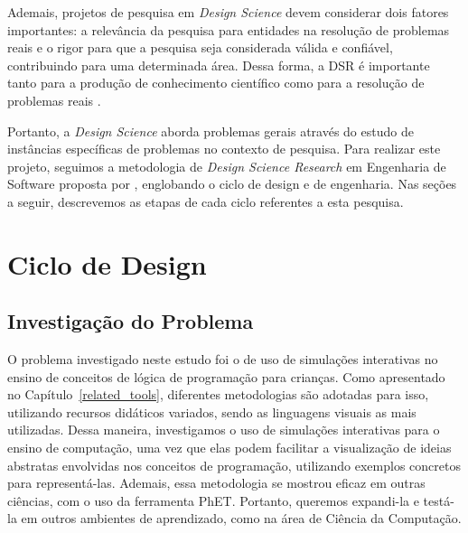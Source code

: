 Ademais, projetos de pesquisa em \textit{Design Science} devem considerar dois fatores importantes: a relevância da pesquisa para entidades na resolução de problemas reais e o rigor para que a pesquisa seja considerada válida e confiável, contribuindo para uma determinada área. Dessa forma, a DSR é importante tanto para a produção de conhecimento científico como para a resolução de problemas reais \citep{dresch2015design, runeson2020design}.

Portanto, a \textit{Design Science} aborda problemas gerais através do estudo de instâncias específicas de problemas no contexto de pesquisa. Para realizar este projeto, seguimos a metodologia de \textit{Design Science Research} em Engenharia de Software proposta por \citet{wieringa2014design}, englobando o ciclo de design e de engenharia. Nas seções a seguir, descrevemos as etapas de cada ciclo referentes a esta pesquisa.

\section{Ciclo de Design}

\subsection{Investigação do Problema}

O problema investigado neste estudo foi o de uso de simulações interativas no ensino de conceitos de lógica de programação para crianças. Como apresentado no Capítulo~\ref{related_tools}, diferentes metodologias são adotadas para isso, utilizando recursos didáticos variados, sendo as linguagens visuais as mais utilizadas. Dessa maneira, investigamos o uso de simulações interativas para o ensino de computação, uma vez que elas podem facilitar a visualização de ideias abstratas envolvidas nos conceitos de programação, utilizando exemplos concretos para representá-las. Ademais, essa metodologia se mostrou eficaz em outras ciências, com o uso da ferramenta PhET. Portanto, queremos expandi-la e testá-la em outros ambientes de aprendizado, como na área de Ciência da Computação.

%

